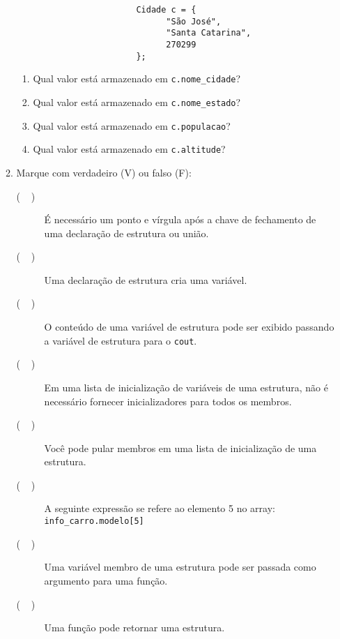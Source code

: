 \documentclass[12pt]{article}
\begin{document}
\begin{enumerate}
\begin{enumerate}
\begin{verbatim}
                        Cidade c = {
                              "São José",
                              "Santa Catarina",
                              270299
                        };
                        \end{verbatim}
                        \begin{enumerate}
                              \item Qual valor está armazenado em \texttt{c.nome\_cidade}?
                              \item Qual valor está armazenado em \texttt{c.nome\_estado}?
                              \item Qual valor está armazenado em \texttt{c.populacao}?
                              \item Qual valor está armazenado em \texttt{c.altitude}?
                        \end{enumerate}
                  \item Marque com verdadeiro (V) ou falso (F):
                        \begin{description}
                              \item[($\phantom{....}$)] É necessário um ponto e vírgula após a chave de fechamento de uma declaração de estrutura ou união.
                              \item[($\phantom{....}$)] Uma declaração de estrutura cria uma variável.
                              \item[($\phantom{....}$)] O conteúdo de uma variável de estrutura pode ser exibido passando a variável de estrutura para o \texttt{cout}.
                              \item[($\phantom{....}$)] Em uma lista de inicialização de variáveis de uma estrutura, não é necessário fornecer inicializadores para todos os membros.
                              \item[($\phantom{....}$)] Você pode pular membros em uma lista de inicialização de uma estrutura.
                              \item[($\phantom{....}$)] A seguinte expressão se refere ao elemento 5 no array:  \texttt{info\_carro.modelo[5]}
                              \item[($\phantom{....}$)] Uma variável membro de uma estrutura pode ser passada como argumento para uma função.
                              \item[($\phantom{....}$)] Uma função pode retornar uma estrutura.
                        \end{description}
            \end{enumerate}


\end{enumerate}
\end{document}
